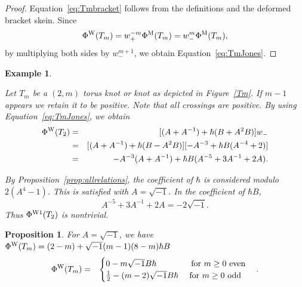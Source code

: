 \documentclass[11pt,fleqn]{amsart} %
\newtheorem{proposition}[theorem]{Proposition}
\newtheorem{example}[theorem]{Example}
\begin{document}
\begin{proof}
Equation~\eqref{eq:Tmbracket} follows from the definitions and the deformed bracket skein.
Since 
$$ \Phi^{\rm W} (T_m)=w_+^{-m}\Phi^{\rm M}(T_m)=w_-^m \Phi^{\rm M}(T_m), $$
 by multiplying both sides by $w_-^{m+1}$, we obtain Equation~\eqref{eq:TmJones}.
\end{proof}



\begin{example}\label{ex:Tmbracket}
{\rm
Let $T_m$ be a $(2,m)$ torus knot or knot as depicted in Figure~\ref{Tm}. 
If $m-1$ appears we retain  it to be positive. Note that all crossings are positive.
By using Equation~\eqref{eq:TmJones}, we obtain 
\begin{eqnarray*}
  \Phi^{\rm W}(T_2) &=&[  (A  + A^{-1}) + \hbar(B + A^2 B) ]  w_- \\
  &=& [ ( A  + A^{-1}) + \hbar (B - A^2B) ] [ - A^{-3} + \hbar B (A^{-4} + 2 ) ]  \\
  &=& -A^{-3}(A  + A^{-1}) + \hbar  B(A^{-5} + 3A^{-1} + 2A). 
\end{eqnarray*}

By Proposition~\ref{prop:allrelations}, the coefficient of $\hbar$ is considered modulo 
$2(A^4-1)$. This is satisfied with $A=\sqrt{-1}$.
In the coefficient of $\hbar B$, 
$$A^{-5} + 3A^{-1} + 2A = - 2 \sqrt{-1}. $$
Thus $\Phi^{{\rm W} 1} (T_2)$ is nontrivial.

}
\end{example}


	\begin{proposition} 
		For $A=\sqrt{-1}$,  we have $\Phi^{{\rm W}} (T_m) = (2-m) +  \sqrt{-1} (m-1)  (8 - m)  \hbar  B$
		\begin{eqnarray*}
				\Phi^{{\rm W}} (T_m) &=& 
				\begin{cases}
							0 - m\sqrt{-1}B\hbar \ \ \ \ \hspace{10mm} {\rm for}\ m\geq 0\  {\rm even}\\
							\frac{1}{2} - (m-2)\sqrt{-1}B \hbar\ \  \ \ {\rm for}\  m\geq 0\ {\rm odd}
				\end{cases}.
		\end{eqnarray*} 
	\end{proposition}
	
\end{document}
